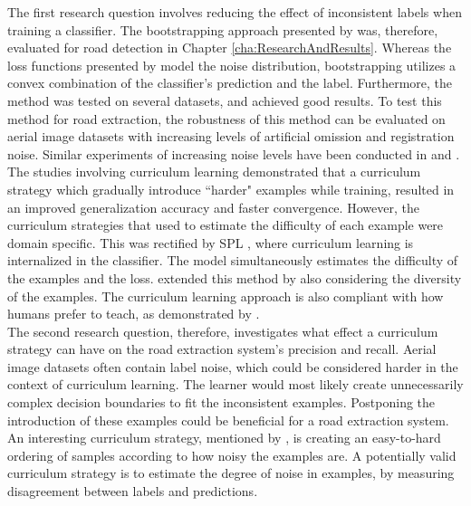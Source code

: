 The first research question involves reducing the effect of inconsistent labels when training a classifier. The bootstrapping approach presented by \cite{Reed_noisy_labels_bootstrapping} was, therefore, evaluated for road detection in Chapter \ref{cha:ResearchAndResults}. Whereas the loss functions presented by \cite{Mnih_aerial_images_noisy} model the noise distribution,  bootstrapping utilizes a convex combination of the classifier's prediction and the label. Furthermore, the method was tested on several datasets, and achieved good results. To test this method for road extraction, the robustness of this method can be evaluated on aerial image datasets with increasing levels of artificial omission and registration noise. Similar experiments of increasing noise levels have been conducted in \citep{Sukhbaatar_noisy_network_learning} and \citep{Reed_noisy_labels_bootstrapping}.\\

The studies involving curriculum learning demonstrated that a curriculum strategy which gradually introduce ``harder" examples while training, resulted in an improved generalization accuracy and faster convergence. However, the curriculum strategies that \cite{Bengio_curriculumlearning} used to estimate the difficulty of each example were domain specific. This was rectified by \ac{SPL} \citep{Kumar_self_paced_learning}, where curriculum learning is internalized in the classifier. The model simultaneously estimates the difficulty of the examples and the loss. \cite{Lu_self-paced_learning_diversity} extended this method by also considering the diversity of the examples. The curriculum learning approach is also compliant with how humans prefer to teach, as demonstrated by \cite{Khan_human_teach}.\\

The second research question, therefore, investigates what effect a curriculum strategy can have on the road extraction system's precision and recall. Aerial image datasets often contain label noise, which could be considered harder in the context of curriculum learning. The learner would most likely create unnecessarily complex decision boundaries to fit the inconsistent examples. Postponing the introduction of these examples could be beneficial for a road extraction system. An interesting curriculum strategy, mentioned by \cite{Bengio_curriculumlearning}, is creating an easy-to-hard ordering of samples according to how noisy the examples are. A potentially valid curriculum strategy is to estimate the degree of noise in examples, by measuring disagreement between labels and predictions.\\